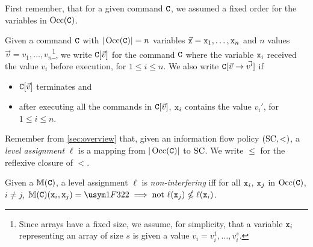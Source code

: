 First remember, that for a given command $\mathtt{C}$, we assumed a fixed order for the variables in \(\operatorname{Occ}(\mathtt{C})\).

\begin{definition}
Given a command \(\mathtt{C}\) with \(|\operatorname{Occ}(\mathtt{C})|=n\) variables \(\vec{\mathtt{x}}=\mathtt{x}_1, \hdots, \mathtt{x}_n\) and \(n\) values \(\vec{v}=v_1, \hdots, v_n\)\footnote{Since arrays have a fixed size, we assume, for simplicity, that a variable $\mathtt{x}_i$ representing an array of size $s$ is given a value $v_i = v_i^1, \hdots, v_i^s$.}, we write \(\comm{C}[%
\vec{v}]\) for the command \(\mathtt{C}\) where the variable \(\mathtt{x}_i\) received the value \(v_i\) before execution, for \(1 \leqslant i \leqslant n\).
We also write \(\mathtt{C}[\vec{v} \rightarrow \vec{v'}]\) if \begin{itemize}
\item \(\mathtt{C}[\vec{v}]\) terminates and
\item after executing all the commands in \(\mathtt{C}[\vec{v}]\), \(\mathtt{x}_i\) contains the value \(v_i'\), for \(1 \leqslant i \leqslant n\).
\end{itemize}
\end{definition}

Remember from \autoref{sec:overview} that, given an information flow policy \((\mathrm{SC}, <)\), a \emph{level assignment} \(\ell\) is a mapping from \(|\operatorname{Occ}(\mathtt{C})|\) to \(\mathrm{SC}\).
We write \(\leqslant\) for the reflexive closure of \(<\).



\begin{definition}
\label{def:level-ni}
Given a %
\SFM $\mathbb{M}(\mathtt{C})$, a level assignment \(\ell\) is \emph{non-interfering} iff for all \(\mathtt{x}_i\), \(\mathtt{x}_j\) in \(\operatorname{Occ}(\mathtt{C})\), \(i \neq j\), \(\sfm{C}(\comm{x}_i, \comm{x}_j)= \vi \implies \text{not } \ell(\comm{x}_j) \nleqslant \ell(\comm{x}_i)\).
\end{definition}


